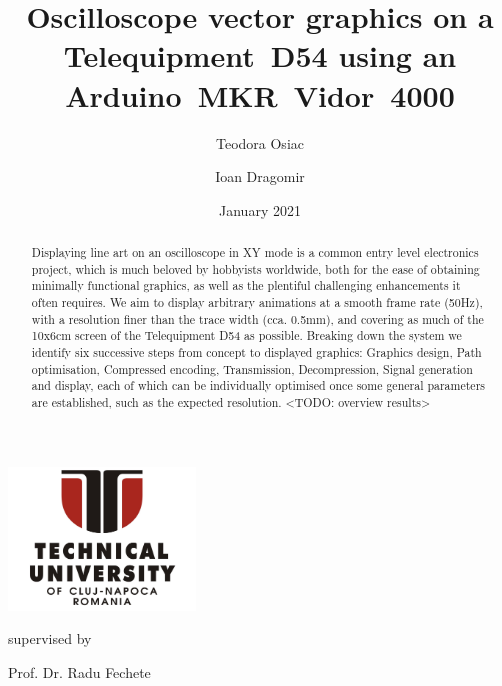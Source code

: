 \documentclass[12pt]{article}
\title{Oscilloscope vector graphics on a \mbox{Telequipment D54} using an \mbox{Arduino MKR Vidor 4000}}
\author{Teodora Osiac \and Ioan Dragomir}
\date{January 2021}
\begin{document}
\makeatletter
\renewcommand{\and}{\quad}
\begin{titlepage}
	\vspace*{\fill}
	\centering

	\makeatletter
	\centering{\LARGE\bfseries \@title \par} \vspace{1.5cm}

	\includegraphics[height=1.5in]{images/tucn-logo.jpg}\par

	\vspace{1.5cm}
	{\Large\@author \par}\vspace{0.45cm}

	{\large supervised by\par
	Prof. Dr. Radu Fechete}

	\vspace*{\fill}
	{\large \@date\par}
\end{titlepage}
\makeatother

\begin{abstract}
\noindent Displaying line art on an oscilloscope in XY mode is a common entry level electronics project, which is much beloved by hobbyists worldwide, both for the ease of obtaining minimally functional graphics, as well as the plentiful challenging enhancements it often requires. We aim to display arbitrary animations at a smooth frame rate (50Hz), with a resolution finer than the trace width (cca. 0.5mm), and covering as much of the 10x6cm screen of the Telequipment D54 as possible. Breaking down the system we identify six successive steps from concept to displayed graphics: Graphics design, Path optimisation, Compressed encoding, Transmission, Decompression, Signal generation and display, each of which can be individually optimised once some general parameters are established, such as the expected resolution. <TODO: overview results>

\end{abstract}

\setcounter{tocdepth}{2}
\tableofcontents
\end{document}
